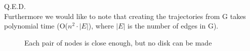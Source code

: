 \documentclass[a4paper,11pt]{article}
\begin{document}
Q.E.D.\\

Furthermore we would like to note that creating the trajectories from G takes polynomial time (O($n^2\cdot|E|$), where $|E|$ is the number of edges in G).

\begin{figure}[H]
	\centering
	\def\svgwidth{0.5\textwidth}
	
	\caption{Each pair of nodes is close enough, but no disk can be made}
	\label{fig:nodisk}
\end{figure}
\end{document}
